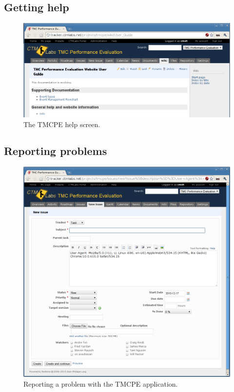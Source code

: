 \documentclass[12pt]{report}
\renewcommand{\fixme}[3][]{#1\xspace}
\newcounter{space}
\begin{document}
\subsection{Getting help}
\label{sec:ui-help}

\begin{figure}[t]
  \begin{center}
    \includegraphics[width=\textwidth]{images/tmcpe-main-help.png}
    \caption{The TMCPE help screen.}
    \label{fig:tmcpe-main-help}
  \end{center}
\end{figure}

\fixme{crindt}{Note that help resides on the project interface.  This is a portability issue.}

\subsection{Reporting problems}
\label{sec:ui-prob}

\begin{figure}[t]
  \begin{center}
    \includegraphics[width=\textwidth]{images/tmcpe-report-problem.png}
    \caption{Reporting a problem with the TMCPE application.}
    \label{fig:tmcpe-report-problem}
  \end{center}
\end{figure}
\end{document}
